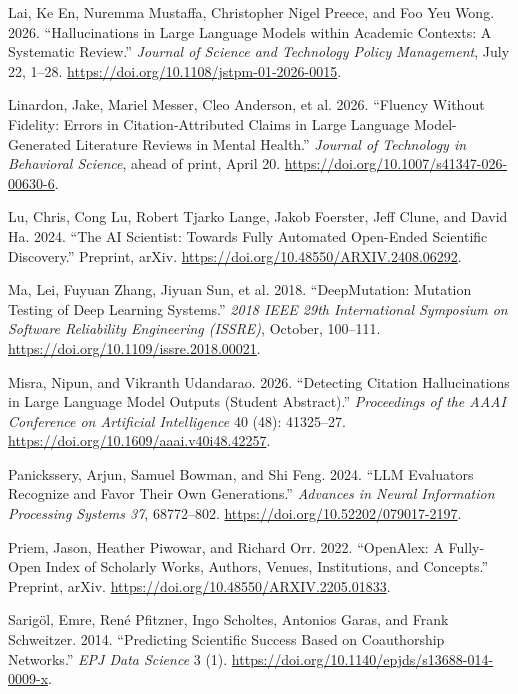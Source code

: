 \documentclass[
]{article}
\newlength{\cslhangindent}
\newenvironment{CSLReferences}[2] %
 {\begin{list}{}{%
  \setlength{\itemindent}{0pt}
  \setlength{\leftmargin}{0pt}
  \setlength{\parsep}{0pt}
  \ifodd #1
   \setlength{\leftmargin}{\cslhangindent}
   \setlength{\itemindent}{-1\cslhangindent}
  \fi
  \setlength{\itemsep}{#2\baselineskip}}}
 {\end{list}}
\begin{document}
\begin{CSLReferences}{1}{1}
Lai, Ke En, Nuremma Mustaffa, Christopher Nigel Preece, and Foo Yeu
Wong. 2026. {``Hallucinations in Large Language Models within Academic
Contexts: A Systematic Review.''} \emph{Journal of Science and
Technology Policy Management}, July 22, 1--28.
\url{https://doi.org/10.1108/jstpm-01-2026-0015}.

Linardon, Jake, Mariel Messer, Cleo Anderson, et al. 2026. {``Fluency
Without Fidelity: Errors in Citation-Attributed Claims in Large Language
Model-Generated Literature Reviews in Mental Health.''} \emph{Journal of
Technology in Behavioral Science}, ahead of print, April 20.
\url{https://doi.org/10.1007/s41347-026-00630-6}.

Lu, Chris, Cong Lu, Robert Tjarko Lange, Jakob Foerster, Jeff Clune, and
David Ha. 2024. {``The AI Scientist: Towards Fully Automated Open-Ended
Scientific Discovery.''} Preprint, arXiv.
\url{https://doi.org/10.48550/ARXIV.2408.06292}.

Ma, Lei, Fuyuan Zhang, Jiyuan Sun, et al. 2018. {``DeepMutation:
Mutation Testing of Deep Learning Systems.''} \emph{2018 IEEE 29th
International Symposium on Software Reliability Engineering (ISSRE)},
October, 100--111. \url{https://doi.org/10.1109/issre.2018.00021}.

Misra, Nipun, and Vikranth Udandarao. 2026. {``Detecting Citation
Hallucinations in Large Language Model Outputs (Student Abstract).''}
\emph{Proceedings of the AAAI Conference on Artificial Intelligence} 40
(48): 41325--27. \url{https://doi.org/10.1609/aaai.v40i48.42257}.

Panickssery, Arjun, Samuel Bowman, and Shi Feng. 2024. {``LLM Evaluators
Recognize and Favor Their Own Generations.''} \emph{Advances in Neural
Information Processing Systems 37}, 68772--802.
\url{https://doi.org/10.52202/079017-2197}.

Priem, Jason, Heather Piwowar, and Richard Orr. 2022. {``OpenAlex: A
Fully-Open Index of Scholarly Works, Authors, Venues, Institutions, and
Concepts.''} Preprint, arXiv.
\url{https://doi.org/10.48550/ARXIV.2205.01833}.

Sarigöl, Emre, René Pfitzner, Ingo Scholtes, Antonios Garas, and Frank
Schweitzer. 2014. {``Predicting Scientific Success Based on Coauthorship
Networks.''} \emph{EPJ Data Science} 3 (1).
\url{https://doi.org/10.1140/epjds/s13688-014-0009-x}.


\end{CSLReferences}
\end{document}
